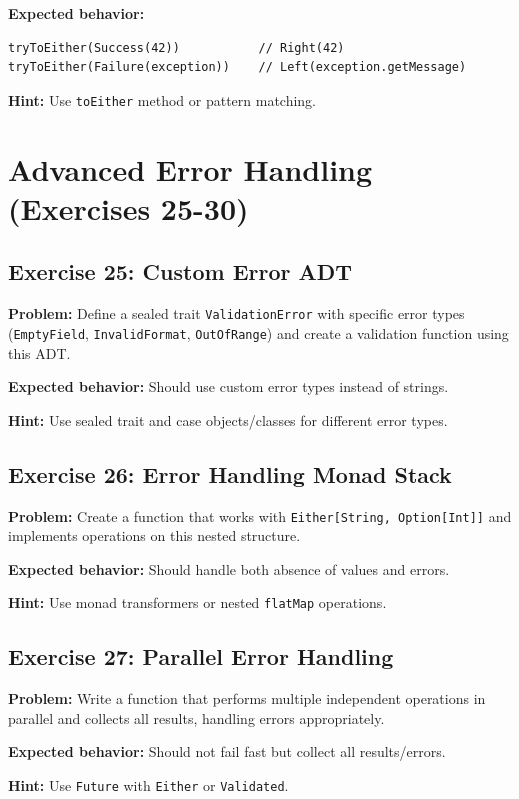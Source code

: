 \documentclass[12pt,a4paper]{article}
\begin{document}
\textbf{Expected behavior:}
\begin{lstlisting}
tryToEither(Success(42))           // Right(42)
tryToEither(Failure(exception))    // Left(exception.getMessage)
\end{lstlisting}

\textbf{Hint:} Use \texttt{toEither} method or pattern matching.

\section{Advanced Error Handling (Exercises 25-30)}

\subsection{Exercise 25: Custom Error ADT}
\textbf{Problem:} Define a sealed trait \texttt{ValidationError} with specific error types (\texttt{EmptyField}, \texttt{InvalidFormat}, \texttt{OutOfRange}) and create a validation function using this ADT.

\textbf{Expected behavior:} Should use custom error types instead of strings.

\textbf{Hint:} Use sealed trait and case objects/classes for different error types.

\subsection{Exercise 26: Error Handling Monad Stack}
\textbf{Problem:} Create a function that works with \texttt{Either[String, Option[Int]]} and implements operations on this nested structure.

\textbf{Expected behavior:} Should handle both absence of values and errors.

\textbf{Hint:} Use monad transformers or nested \texttt{flatMap} operations.

\subsection{Exercise 27: Parallel Error Handling}
\textbf{Problem:} Write a function that performs multiple independent operations in parallel and collects all results, handling errors appropriately.

\textbf{Expected behavior:} Should not fail fast but collect all results/errors.

\textbf{Hint:} Use \texttt{Future} with \texttt{Either} or \texttt{Validated}.
\end{document}
